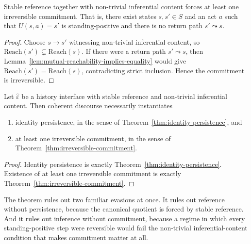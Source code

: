 \begin{theorem}
\label{thm:irreversible-commitment}
Stable reference together with non-trivial inferential content forces at least one irreversible commitment. That is, there exist states $s,s'\in S$ and an act $a$ such that $U(s,a)=s'$ is standing-positive and there is no return path $s'\leadsto s$.
\end{theorem}

\begin{proof}
Choose $s\to s'$ witnessing non-trivial inferential content, so $\mathrm{Reach}(s')\subsetneq \mathrm{Reach}(s)$. If there were a return path $s'\leadsto s$, then Lemma~\ref{lem:mutual-reachability-implies-equality} would give $\mathrm{Reach}(s')=\mathrm{Reach}(s)$, contradicting strict inclusion. Hence the commitment is irreversible.\cite{MaleyAMetric}
\end{proof}

\begin{theorem}
\label{thm:coherence-necessity}
Let $\hat\varepsilon$ be a history interface with stable reference and non-trivial inferential content. Then coherent discourse necessarily instantiates
\begin{enumerate}
  \item identity persistence, in the sense of Theorem~\ref{thm:identity-persistence}, and
  \item at least one irreversible commitment, in the sense of Theorem~\ref{thm:irreversible-commitment}.
\end{enumerate}
\end{theorem}

\begin{proof}
Identity persistence is exactly Theorem~\ref{thm:identity-persistence}. Existence of at least one irreversible commitment is exactly Theorem~\ref{thm:irreversible-commitment}.\cite{MaleyAMetric}
\end{proof}

\begin{remark}
The theorem rules out two familiar evasions at once. It rules out reference without persistence, because the canonical quotient is forced by stable reference. And it rules out inference without commitment, because a regime in which every standing-positive step were reversible would fail the non-trivial inferential-content condition that makes commitment matter at all.\cite{MaleyAMetric}
\end{remark}

